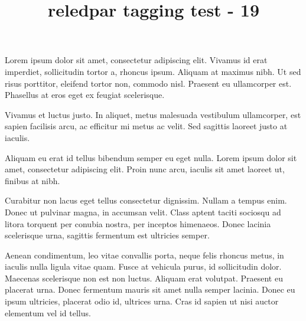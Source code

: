 \documentclass[twoside]{article}
\title{reledpar tagging test - 19}
\begin{document}
\begin{pages}

  \begin{Leftside}
    \beginnumbering
    \autopar

   Lorem ipsum dolor sit amet, consectetur adipiscing elit. Vivamus id erat imperdiet, sollicitudin tortor a, rhoncus ipsum. Aliquam at maximus nibh. Ut sed risus porttitor, eleifend tortor non, commodo nisl. Praesent eu ullamcorper est. Phasellus at eros eget ex feugiat scelerisque.

	Vivamus et luctus justo. In aliquet, metus malesuada vestibulum ullamcorper, est sapien facilisis arcu, ac efficitur mi metus ac velit. Sed sagittis laoreet justo at iaculis.

	Aliquam eu erat id tellus bibendum semper eu eget nulla. Lorem ipsum dolor sit amet, consectetur adipiscing elit. Proin nunc arcu, iaculis sit amet laoreet ut, finibus at nibh.

	Curabitur non lacus eget tellus consectetur dignissim. Nullam a tempus enim. Donec ut pulvinar magna, in accumsan velit. Class aptent taciti sociosqu ad litora torquent per conubia nostra, per inceptos himenaeos. Donec lacinia scelerisque urna, sagittis fermentum est ultricies semper.

	Aenean condimentum, leo vitae convallis porta, neque felis rhoncus metus, in iaculis nulla ligula vitae quam. Fusce at vehicula purus, id sollicitudin dolor. Maecenas scelerisque non est non luctus. Aliquam erat volutpat. Praesent eu placerat urna. Donec fermentum mauris sit amet nulla semper lacinia. Donec eu ipsum ultricies, placerat odio id, ultrices urna. Cras id sapien ut nisi auctor elementum vel id tellus.


\end{Leftside}
\end{pages}
\end{document}
